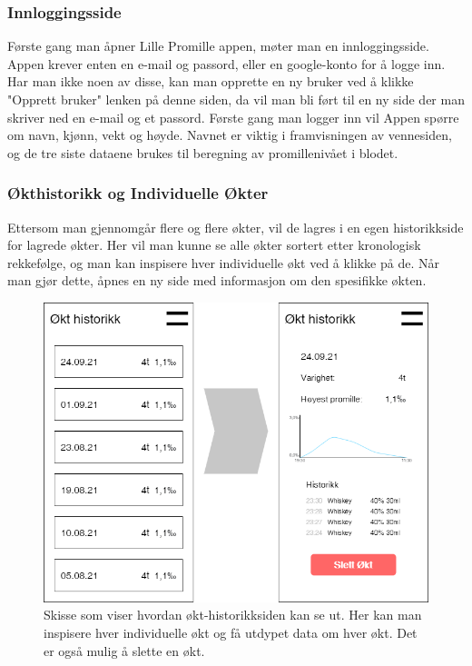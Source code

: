 \subsubsection{Innloggingsside}
Første gang man åpner Lille Promille appen, møter man en innloggingsside. Appen krever enten en e-mail og passord, eller en google-konto for å logge inn. Har man ikke noen av disse, kan man opprette en ny bruker ved å klikke "Opprett bruker" lenken på denne siden, da vil man bli ført til en ny side der man skriver ned en e-mail og et passord. Første gang man logger inn vil Appen spørre om navn, kjønn, vekt og høyde. Navnet er viktig i framvisningen av vennesiden, og de tre siste dataene brukes til beregning av promillenivået i blodet.

\subsubsection{Økthistorikk og Individuelle Økter}
Ettersom man gjennomgår flere og flere økter, vil de lagres i en egen historikkside for lagrede økter. Her vil man kunne se alle økter sortert etter kronologisk rekkefølge, og man kan inspisere hver individuelle økt ved å klikke på de. Når man gjør dette, åpnes en ny side med informasjon om den spesifikke økten.

\begin{figure}[H]
    \centering
    \includegraphics[scale=0.4]{images/lille_promille_sessions.drawio.png}
    \caption{Skisse som viser hvordan økt-historikksiden kan se ut. Her kan man inspisere hver individuelle økt og få utdypet data om hver økt. Det er også mulig å slette en økt.}
\end{figure}